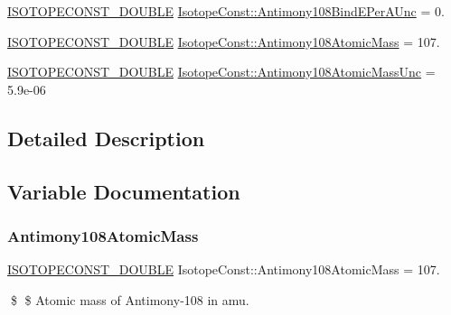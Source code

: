 \begin{DoxyCompactItemize}
\mbox{\hyperlink{group___isotope_const-_macros_ga8f45a7272ce02c0b4c65c44636ed719a}{I\+S\+O\+T\+O\+P\+E\+C\+O\+N\+S\+T\+\_\+\+D\+O\+U\+B\+LE}} \mbox{\hyperlink{group___isotope_const-_antimony-_sb108_ga07ef70b8621ca6c677b98288999ae81f}{Isotope\+Const\+::\+Antimony108\+Bind\+E\+Per\+A\+Unc}} = 0.
\item 
\mbox{\hyperlink{group___isotope_const-_macros_ga8f45a7272ce02c0b4c65c44636ed719a}{I\+S\+O\+T\+O\+P\+E\+C\+O\+N\+S\+T\+\_\+\+D\+O\+U\+B\+LE}} \mbox{\hyperlink{group___isotope_const-_antimony-_sb108_gadb99ff01e2898ac98234969ef0c1806b}{Isotope\+Const\+::\+Antimony108\+Atomic\+Mass}} = 107.
\item 
\mbox{\hyperlink{group___isotope_const-_macros_ga8f45a7272ce02c0b4c65c44636ed719a}{I\+S\+O\+T\+O\+P\+E\+C\+O\+N\+S\+T\+\_\+\+D\+O\+U\+B\+LE}} \mbox{\hyperlink{group___isotope_const-_antimony-_sb108_gabaf9dc3a3374786c02a2dab9ee1b5e81}{Isotope\+Const\+::\+Antimony108\+Atomic\+Mass\+Unc}} = 5.\+9e-\/06
\end{DoxyCompactItemize}


\subsection{Detailed Description}


\subsection{Variable Documentation}
\mbox{\label{group___isotope_const-_antimony-_sb108_gadb99ff01e2898ac98234969ef0c1806b}} 
\subsubsection{\texorpdfstring{Antimony108\+Atomic\+Mass}{Antimony108AtomicMass}}
{\footnotesize\ttfamily \mbox{\hyperlink{group___isotope_const-_macros_ga8f45a7272ce02c0b4c65c44636ed719a}{I\+S\+O\+T\+O\+P\+E\+C\+O\+N\+S\+T\+\_\+\+D\+O\+U\+B\+LE}} Isotope\+Const\+::\+Antimony108\+Atomic\+Mass = 107.}

\$ \$ Atomic mass of Antimony-\/108 in amu. \mbox{\label{group___isotope_const-_antimony-_sb108_gabaf9dc3a3374786c02a2dab9ee1b5e81}} 
